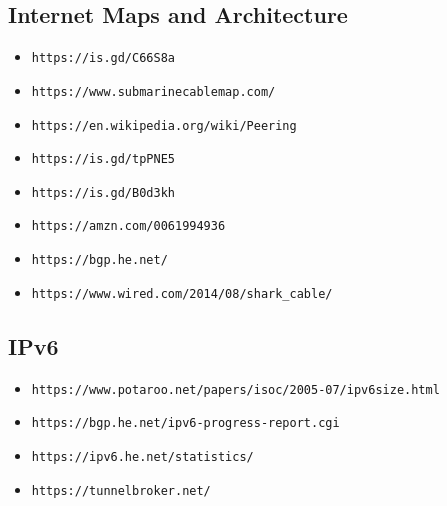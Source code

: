 \documentclass[xga]{xdvislides}
\begin{document}
\subsection{Internet Maps and Architecture}
\begin{itemize}
	\item \verb+https://is.gd/C66S8a+
	\item \verb+https://www.submarinecablemap.com/+
	\item \verb+https://en.wikipedia.org/wiki/Peering+
	\item \verb+https://is.gd/tpPNE5+
	\item \verb+https://is.gd/B0d3kh+
	\item \verb+https://amzn.com/0061994936+
	\item \verb+https://bgp.he.net/+
	\item \verb+https://www.wired.com/2014/08/shark_cable/+
\end{itemize}

\subsection{IPv6}
\begin{itemize}
	\item \verb+https://www.potaroo.net/papers/isoc/2005-07/ipv6size.html+
	\item \verb+https://bgp.he.net/ipv6-progress-report.cgi+
	\item \verb+https://ipv6.he.net/statistics/+
	\item \verb+https://tunnelbroker.net/+
\end{itemize}

%
\end{document}
